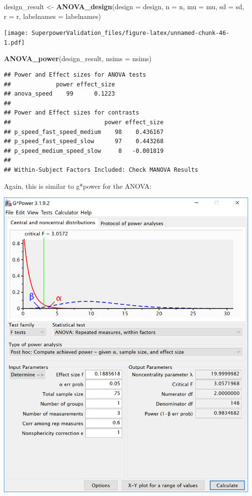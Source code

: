\documentclass[]{book}
\newenvironment{Shaded}{\begin{snugshade}}{\end{snugshade}}
\newcommand{\DataTypeTok}[1]{\textcolor[rgb]{0.13,0.29,0.53}{#1}}
\newcommand{\KeywordTok}[1]{\textcolor[rgb]{0.13,0.29,0.53}{\textbf{#1}}}
\newcommand{\NormalTok}[1]{#1}
\newcommand{\StringTok}[1]{\textcolor[rgb]{0.31,0.60,0.02}{#1}}
\begin{document}
\begin{Shaded}
\begin{Highlighting}[]
\NormalTok{design_result <-}\StringTok{ }\KeywordTok{ANOVA_design}\NormalTok{(}\DataTypeTok{design =}\NormalTok{ design,}
                   \DataTypeTok{n =}\NormalTok{ n, }
                   \DataTypeTok{mu =}\NormalTok{ mu, }
                   \DataTypeTok{sd =}\NormalTok{ sd, }
                   \DataTypeTok{r =}\NormalTok{ r, }
                   \DataTypeTok{labelnames =}\NormalTok{ labelnames)}
\end{Highlighting}
\end{Shaded}

\texttt{[image: SuperpowerValidation\_files/figure-latex/unnamed-chunk-46-1.pdf]}

\begin{Shaded}
\begin{Highlighting}[]
\KeywordTok{ANOVA_power}\NormalTok{(design_result, }\DataTypeTok{nsims =}\NormalTok{ nsims)}
\end{Highlighting}
\end{Shaded}

\begin{verbatim}
## Power and Effect sizes for ANOVA tests
##             power effect_size
## anova_speed    99      0.1223
## 
## Power and Effect sizes for contrasts
##                           power effect_size
## p_speed_fast_speed_medium    98    0.436167
## p_speed_fast_speed_slow      97    0.443268
## p_speed_medium_speed_slow     8   -0.001819
## 
## Within-Subject Factors Included: Check MANOVA Results
\end{verbatim}

Again, this is similar to g*power for the ANOVA:

\includegraphics{screenshots/gpower_4.png}
\end{document}

